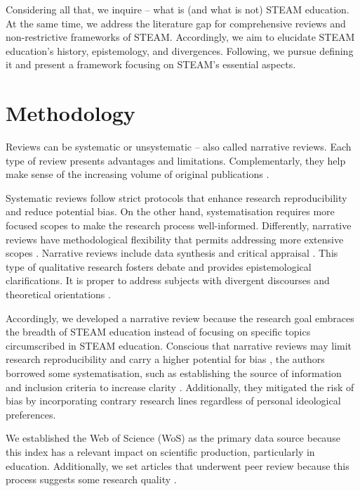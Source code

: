 \documentclass[english]{textolivre}
\begin{document}
Considering all that, we inquire – what is (and what is not) STEAM education. At the same time, we address the literature gap for comprehensive reviews and non-restrictive frameworks of STEAM. Accordingly, we aim to elucidate STEAM education’s history, epistemology, and divergences. Following, we pursue defining it and present a framework focusing on STEAM’s essential aspects.


\section{Methodology}

Reviews can be systematic or unsystematic – also called narrative reviews. Each type of review presents advantages and limitations. Complementarly, they help make sense of the increasing volume of original publications \cite{ferrari_writing_2015}.

Systematic reviews follow strict protocols that enhance research reproducibility and reduce potential bias. On the other hand, systematisation requires more focused scopes to make the research process well-informed. Differently, narrative reviews have methodological flexibility that permits addressing more extensive scopes \cite{byrne_improving_2016}. Narrative reviews include data synthesis and critical appraisal \cite{byrne_improving_2016}. This type of qualitative research fosters debate and provides epistemological clarifications. It is proper to address subjects with divergent discourses and theoretical orientations \cite{green_writing_2006}.

Accordingly, we developed a narrative review because the research goal embraces the breadth of STEAM education instead of focusing on specific topics circumscribed in STEAM education. Conscious that narrative reviews may limit research reproducibility and carry a higher potential for bias \cite{ferrari_writing_2015, byrne_improving_2016}, the authors borrowed some systematisation, such as establishing the source of information and inclusion criteria to increase clarity \cite{ferrari_writing_2015}. Additionally, they mitigated the risk of bias by incorporating contrary research lines regardless of personal ideological preferences.

We established the Web of Science (WoS) as the primary data source because this index has a relevant impact on scientific production, particularly in education. Additionally, we set articles that underwent peer review because this process suggests some research quality \cite{ardoin_early_2020}.
\end{document}
